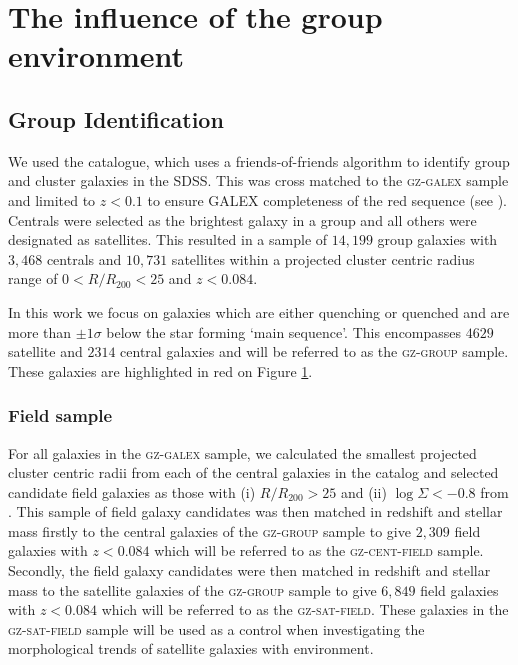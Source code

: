 \chapter{The influence of the group environment}


\section{Group Identification}\label{sec:groups}

We used the \citet{berlind06} catalogue, which uses a friends-of-friends algorithm to identify group and cluster galaxies in the SDSS. This was cross matched to the \textsc{gz-galex} sample and limited to $z < 0.1$ to ensure GALEX completeness of the red sequence (see \citealt{ref}). Centrals were selected as the brightest galaxy in a group and all others were designated as satellites. This resulted in a sample of $14,199$ group galaxies with $3,468$ centrals and $10,731$ satellites within a projected cluster centric radius range of $0 < R/R_{200} < 25$ and $z < 0.084$. 

In this work we focus on galaxies which are either quenching or quenched and are more than $\pm1\sigma$ below the star forming `main sequence'. This encompasses $4629$ satellite and $2314$ central galaxies and will be referred to as the \textsc{gz-group} sample. {\notebsm These galaxies are highlighted in red on Figure \ref{}. }

\subsection{Field sample}\label{sec:field}

For all galaxies in the \textsc{gz-galex} sample, we calculated the smallest projected cluster centric radii from each of the central galaxies in the  \citet{berlind06} catalog and selected candidate field galaxies as those with (i) $R/R_{200} > 25$ and (ii) $\log\Sigma < -0.8$ from \cite{baldry06}. This sample of field galaxy candidates was then matched in redshift and stellar mass firstly to the central galaxies of the \textsc{gz-group} sample to give $2,309$ field galaxies with $z < 0.084$ which will be referred to as the \textsc{gz-cent-field} sample. Secondly, the field galaxy candidates were then matched in redshift and stellar mass to the satellite galaxies of the \textsc{gz-group} sample to give $6,849$ field galaxies with $z < 0.084$ which will be referred to as the \textsc{gz-sat-field}. These galaxies in the \textsc{gz-sat-field} sample will be used as a control when investigating the morphological trends of satellite galaxies with environment. 

